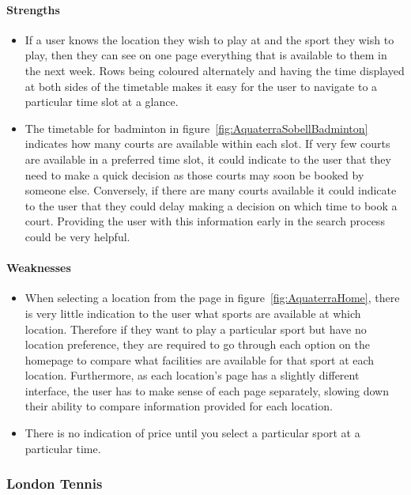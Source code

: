 \paragraph{Strengths}

\begin{itemize}
        \item If a user knows the location they wish to play at and the sport they wish to play,  then they can see on one page everything that is available to them in the next week. Rows being coloured alternately and having the time displayed at both sides of the timetable makes it easy for the user to navigate to a particular time slot at a glance.
        \item The timetable for badminton in figure~\ref{fig:AquaterraSobellBadminton} indicates how many courts are available within each slot. If very few courts are available in a preferred time slot, it could indicate to the user that they need to make a quick decision as those courts may soon be booked by someone else. Conversely, if there are many courts available it could indicate to the user that they could delay making a decision on which time to book a court. Providing the user with this information early in the search process could be very helpful.
\end{itemize}

\paragraph{Weaknesses}

\begin{itemize}
        \item When selecting a location from the page in figure~\ref{fig:AquaterraHome}, there is very little indication to the user what sports are available at which location. Therefore if they want to play a particular sport but have no location preference, they are required to go through each option on the homepage to compare what facilities are available for that sport at each location. Furthermore, as each location's page has a slightly different interface, the user has to make sense of each page separately, slowing down their ability to compare information provided for each location.
        \item There is no indication of price until you select a particular sport at a particular time.
\end{itemize}

\subsubsection{London Tennis}
\label{ssub:london_tennis}

